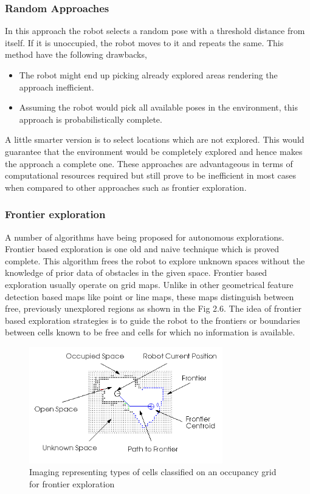 \subsubsection{Random Approaches}
In this approach the robot selects a random pose with a threshold distance from itself. If it is unoccupied, the robot moves to it and repeats the same. This method have the following drawbacks,
\begin{itemize}
    \item The robot might end up picking already explored areas rendering the approach inefficient.
    \item Assuming the robot would pick all available poses in the environment, this approach is probabilistically complete.
\end{itemize}
A little smarter version is to select locations which are not explored. This would guarantee that the environment would be completely explored and hence makes the approach a complete one. These approaches are advantageous in terms of computational resources required but still prove to be inefficient in most cases when compared to other approaches such as frontier exploration.

\subsubsection{Frontier exploration}
A number of algorithms have being proposed for autonomous explorations. Frontier based exploration is one old and naive technique which is proved complete. This algorithm frees the robot to explore unknown spaces without the knowledge of prior data of obstacles in the given space. Frontier based exploration usually operate on grid maps. Unlike in other geometrical feature detection based maps like point or line maps, these maps distinguish between free, previously unexplored regions as shown in the Fig 2.6. The idea of frontier based exploration strategies is to guide the robot to the frontiers or boundaries between cells known to be free and cells for which no information is available\cite{25}. 

\begin{figure}
    \centering
    \includegraphics[width=0.75\textwidth]{images/frontier1.png}
    \caption{Imaging representing types of cells classified on an occupancy grid for frontier exploration}
    \label{fig:my_label}
\end{figure}

